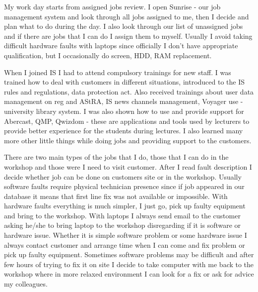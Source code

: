 \documentclass[10pt,a4paper,headinclude=true]{report}
\begin{document}
My work day starts from assigned jobs review. I open Sunrise - our job management system and look through all jobs assigned to me, then I decide and plan what to do during the day. I also look through our list of unassigned jobs and if there are jobs that I can do I assign them to myself. Usually I avoid taking difficult hardware faults with laptops since officially I don't have appropriate qualification, but I occasionally do screen, HDD, RAM replacement.

When I joined IS I had to attend compulsory trainings for new staff. I was trained how to deal with customers in different situations, introduced to the IS rules and regulations, data protection act. Also received trainings about user data management on reg and AStRA, IS news channels management, Voyager use - university library system. I was also shown how to use and provide support for Abercast, QMP, Qwizdom - these are applications and tools used by lecturers to provide better experience for the students during lectures. I also learned many more other little things while doing jobs and providing support to the customers.

There are two main types of the jobs that I do, those that I can do in the workshop and those were I need to visit customer. After I read fault description I decide whether job can be done on customers site or in the workshop. Usually software faults require physical technician presence since if job appeared in our database it means that first line fix was not available or impossible. With hardware faults everything is much simpler, I just go, pick up faulty equipment and bring to the workshop. With laptops I always send email to the customer asking he/she to bring laptop to the workshop disregarding if it is software or hardware issue. Whether it is simple software problem or some hardware issue I always contact customer and arrange time when I can come and fix problem or pick up faulty equipment. Sometimes software problems may be difficult and after few hours of trying to fix it on site I decide to take computer with me back to the workshop where in more relaxed environment I can look for a fix or ask for advice my colleagues.
\end{document}
